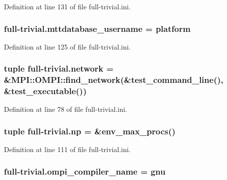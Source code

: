 Definition at line 131 of file full-\/trivial.\-ini.

\hypertarget{namespacefull-trivial_a2556ba8e56d9edb19b2a7dcff147fd83}{
\subsubsection[{mttdatabase\-\_\-username}]{\setlength{\rightskip}{0pt plus 5cm}full-\/trivial.\-mttdatabase\-\_\-username = platform}}\label{namespacefull-trivial_a2556ba8e56d9edb19b2a7dcff147fd83}


Definition at line 125 of file full-\/trivial.\-ini.

\hypertarget{namespacefull-trivial_aec768b574435ba99bb3d8737549d08e5}{
\subsubsection[{network}]{\setlength{\rightskip}{0pt plus 5cm}tuple full-\/trivial.\-network = \&M\-P\-I\-::\-O\-M\-P\-I\-::find\-\_\-network(\&test\-\_\-command\-\_\-line(), \&test\-\_\-executable())}}\label{namespacefull-trivial_aec768b574435ba99bb3d8737549d08e5}


Definition at line 78 of file full-\/trivial.\-ini.

\hypertarget{namespacefull-trivial_acf328fb05e5f171cd49e3b6930f21f2f}{
\subsubsection[{np}]{\setlength{\rightskip}{0pt plus 5cm}tuple full-\/trivial.\-np = \&env\-\_\-max\-\_\-procs()}}\label{namespacefull-trivial_acf328fb05e5f171cd49e3b6930f21f2f}


Definition at line 111 of file full-\/trivial.\-ini.

\hypertarget{namespacefull-trivial_ab1eddfc5389978f354d58c7637810d41}{
\subsubsection[{ompi\-\_\-compiler\-\_\-name}]{\setlength{\rightskip}{0pt plus 5cm}full-\/trivial.\-ompi\-\_\-compiler\-\_\-name = gnu}}\label{namespacefull-trivial_ab1eddfc5389978f354d58c7637810d41}


